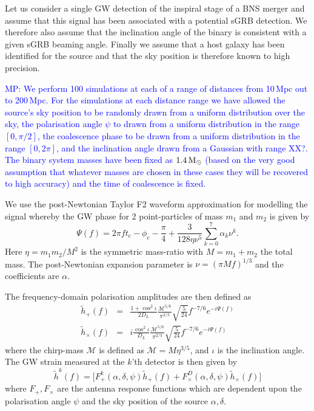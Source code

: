 \documentclass[10pt]{iopart}
\newcommand{\gws}{\tilde{h}}
\newcommand{\MP}[1]{\textcolor{blue}{MP: #1}}
\begin{document}
Let us consider a single \ac{GW} detection of the inspiral stage of a \ac{BNS}
merger and assume that this signal has been associated with a potential
\ac{sGRB} detection. We therefore also assume that the inclination angle
of the binary is consistent with a given \ac{sGRB} beaming angle.  Finally we
assume that a host galaxy has been identified for the source and that the sky
position is therefore known to high precision.

\MP{We perform 100 simulations at each of a range of distances from 10\,Mpc out
to 200\,Mpc. For the simulations at each distance range we have allowed the
source's sky position to be randomly drawn from a uniform distribution over
the sky, the polarisation angle $\psi$ to drawn from a uniform distribution in the
range $[0, \pi/2]$, the coalescence phase to be drawn from a uniform distribution
in the range $[0, 2\pi]$, and the inclination angle drawn from a Gaussian with range XX?.
The binary system masses have been fixed as $1.4\,{\rm M}_\odot$ (based on the
very good assumption that whatever masses are chosen in these cases they will be
recovered to high accuracy) and the time of coalescence is fixed.}
 
We use the post-Newtonian Taylor F2 waveform approximation for modelling the
signal whereby the \ac{GW} phase for 2 point-particles of mass $m_{1}$ and
$m_{2}$ is given by
%
\begin{equation}
\label{eq:gwphase}
  \Psi(f) = 2\pi f t_\mathrm{c} - \phi_{\mathrm{c}} - \frac{\pi}{4} +
\frac{3}{128\eta\nu^{5}}\sum\limits_{k=0}^{7}\alpha_{k}\nu^{k}.
\end{equation}
%
Here $\eta=m_{1}m_{2}/M^{2}$ is the symmetric mass-ratio with $M=m_{1}+m_{2}$
the total mass.  The post-Newtonian expansion parameter is $\nu=(\pi M
f)^{1/3}$ and the coefficients are $\alpha$.

The frequency-domain polarisation amplitudes are then defined as
%
\begin{eqnarray}\label{eq:signal}
  \gws_{+}(f) &=& \frac{1+\cos^{2}\iota}{2D_{L}}
\frac{\mathcal{M}^{5/6}}{\pi^{2/3}}
\sqrt{\frac{5}{24}}f^{-7/6}e^{-i\Psi(f)} \nonumber \\
  \gws_{\times}(f) &=&
 i\frac{\cos^{2}\iota}{D_{L}}\frac{\mathcal{M}^{5/6}}{\pi^{2/3}}
\sqrt{\frac{5}{24}}f^{-7/6}e^{-i\Psi(f)}
\end{eqnarray}
%
where the chirp-mass $\mathcal{M}$ is defined as $\mathcal{M}=M\eta^{3/5}$,
and $\iota$ is the inclination angle.  The \ac{GW} strain measured
at the $k$'th detector is then given by
%
\begin{equation}
  \label{eq:gravsig}
   \gws^{k}(f) = \big[ F_{+}^{k}(\alpha, \delta, \psi)\gws_{+}(f) +
F_{\times}^D(\alpha, \delta, \psi)\gws_{\times}(f)\big]
\end{equation}
%
where $F_{+},F_{\times}$ are the antenna response functions which are dependent
upon the polarisation angle $\psi$ and the sky position of the source
$\alpha,\delta$.
\end{document}
